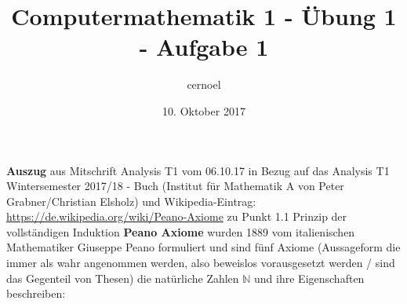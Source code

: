 \documentclass[a4paper,12pt,ngerman,oneside]{article}
\title{Computermathematik 1 - Übung 1 - Aufgabe 1}
\date{10. Oktober 2017}
\author{cernoel\\ }
\begin{document}
 
  \pagestyle{fancy}
  \fancyhf{}
  
  \textbf{Auszug} aus Mitschrift Analysis T1 vom 06.10.17 \break
  in Bezug auf das Analysis T1 Wintersemester 2017/18 - Buch (Institut für Mathematik A von 
  Peter Grabner/Christian Elsholz) und Wikipedia-Eintrag: \url{https://de.wikipedia.org/wiki/Peano-Axiome} \break
  zu Punkt 1.1 Prinzip der vollständigen Induktion \break
  \break
  \textbf{Peano Axiome} wurden 1889 vom italienischen Mathematiker Giuseppe Peano formuliert und sind 
  f\"unf Axiome (Aussageform die immer als wahr angenommen werden, also beweislos vorausgesetzt werden / sind das 
  Gegenteil von Thesen) die nat\"urliche Zahlen $\mathbb{N}$ und ihre Eigenschaften beschreiben:
  
\end{document}
